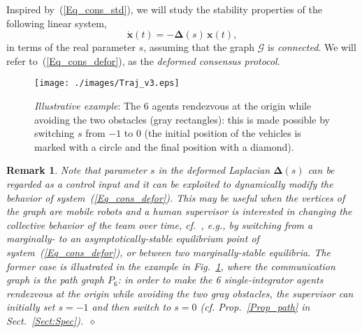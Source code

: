 \documentclass[letterpaper,9pt,twocolumn]{autart}
\newcommand{\vet}[1]{\ensuremath{{\mathbf #1}}}
\newtheorem{remark}{\textbf{Remark}}
\begin{document}
Inspired by~(\ref{Eq_cons_std}), we will study the
stability properties of the following linear system,
\begin{equation}\label{Eq_cons_defor}
\dot{\vet{x}}(t) = -\boldsymbol{\Delta}(s)\,\vet{x}(t), \end{equation}
in terms of the real parameter $s$, assuming that the graph $\mathcal{G}$ is \emph{connected}.
We will refer to~(\ref{Eq_cons_defor}), as the \emph{deformed consensus protocol}.
\begin{figure}[b!]
       \begin{center}
       \texttt{[image: ./images/Traj\_v3.eps]}
       \vspace{-0.15cm} 
       \caption{\emph{Illustrative example}: The 6 agents rendezvous
         at the origin while avoiding the two obstacles (gray rectangles): this
         is made possible by switching $s$ from $-1$ to $0$ (the
         initial position of the vehicles is marked with a circle and the final position
         with a diamond).}\label{FIG:Mov_example}
       \end{center}
\end{figure}

\begin{remark}
Note that parameter $s$ in the deformed Laplacian
$\boldsymbol{\Delta}(s)$ can be regarded as a
control input and it can be exploited to \emph{dynamically} modify the behavior of system~(\ref{Eq_cons_defor}). This may be useful when the
vertices of the graph are mobile robots and a human supervisor
is interested in changing the collective behavior of the team over
time, cf.~\cite{MilutinovicLi_TRO06}, 
e.g., by switching from a marginally- to an asymptotically-stable
equilibrium point of system~(\ref{Eq_cons_defor}), or between two marginally-stable
equilibria. The former case is illustrated in the example in
Fig.~\ref{FIG:Mov_example}, where the communication graph is the path
graph $P_6$: in order to make the 6 single-integrator agents
rendezvous at the origin while avoiding the
two gray obstacles, the supervisor can initially set $s = -1$ and then
switch to $s = 0$ (cf. Prop.~\ref{Prop_path} in Sect.~\ref{Sect:Spec}).~\hfill$\diamond$
\end{remark} 
\end{document}
